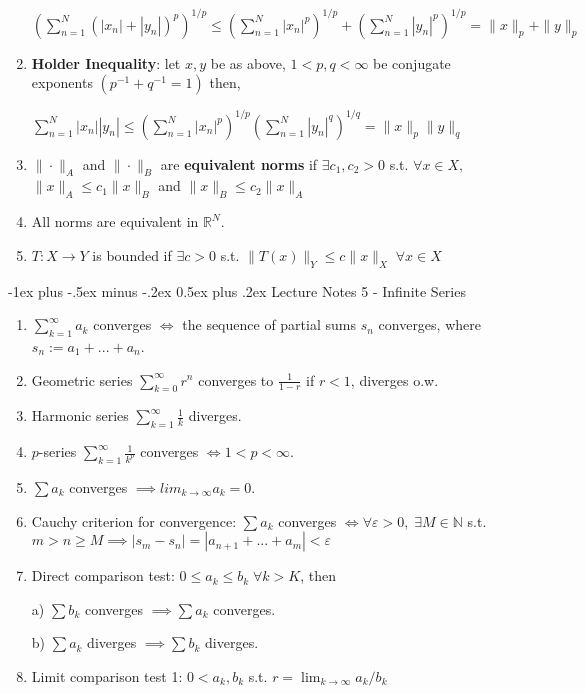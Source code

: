 \documentclass[10pt,landscape]{article}
\makeatletter
\renewcommand{\section}{\@startsection{section}{1}{0mm}%
                                {-1ex plus -.5ex minus -.2ex}%
                                {0.5ex plus .2ex}%
                                {\normalfont\large\bfseries}}
\makeatother
\begin{document}
\begin{multicols}{3}
\begin{enumerate}
$
\left(\sum^N_{n=1} ( |x_n|+|y_n| )^p \right)^{1/p}  \leq \left( \sum^N_{n=1} |x_n|^p \right)^{1/p}+ \left( \sum^N_{n=1} |y_n|^p \right)^{1/p} 
= \|x\|_p +\|y\|_p
$
	\item \textbf{Holder Inequality}: let $x,y$ be as above, $1<p,q<\infty$ be conjugate exponents $(p^{-1}+ q^{-1} = 1)$ then, 
	
$\sum^N_{n=1} |x_n| |y_n| \leq \left( \sum^N_{n=1} |x_n|^p \right)^{1/p}\left( \sum^N_{n=1} |y_n|^q \right)^{1/q} = \| x\|_p \| y\|_q $
	\item $\|\cdot \|_A $ and $\| \cdot\|_B$ are \textbf{equivalent norms} if $\exists c_1, c_2>0$ s.t. $\forall x \in X,$ $\| x\|_A\leq c_1 \| x\|_B$ and $\|x\|_B \leq c_2\|x\|_A$
	\item All norms are equivalent in $\mathbb{R}^N$. 
	\item $T: X \rightarrow Y$ is bounded if $\exists c>0$ s.t. $\|T(x)\|_Y \leq c\|x\|_X \; \forall x \in X$
\end{enumerate}


\section{Lecture Notes 5 - Infinite Series}
\begin{enumerate}
	\item $\sum^\infty_{k=1} a_k $ converges $\iff$ the sequence of partial sums $s_n$ converges, where $s_n := a_1 + ... + a_n$.
	\item Geometric series $\sum^\infty_{k=0} r^n $ converges to $\frac{1}{1-r}$ if $r<1$, diverges o.w.
	\item Harmonic series $\sum^\infty_{k=1}\frac{1}{k}$ diverges.
	\item $p$-series $\sum^\infty_{k=1}\frac{1}{k^p}$ converges $ \iff 1<p<\infty$.
	\item $\sum a_k$ converges $ \implies lim_{k\rightarrow \infty} a_k = 0$.
	\item Cauchy criterion for convergence: $\sum a_k$ converges $\iff \forall \varepsilon >0, \; \exists M\in \mathbb{N} $ s.t. $m>n\geq M  \implies |s_m -s_n| = |a_{n+1} + ...+ a_m | < \varepsilon$
	\item Direct comparison test: $0\leq a_k\leq b_k \; \forall k>K$, then
	
	a) $\sum b_k$ converges $\implies \sum a_k$ converges.
	
	b) $\sum a_k$ diverges $\implies \sum b_k$ diverges.
	\item Limit comparison test 1: $0<a_k, b_k $ s.t. $r = \lim_{k\rightarrow \infty} a_k/b_k$
	

\end{enumerate}
\end{multicols}
\end{document}
